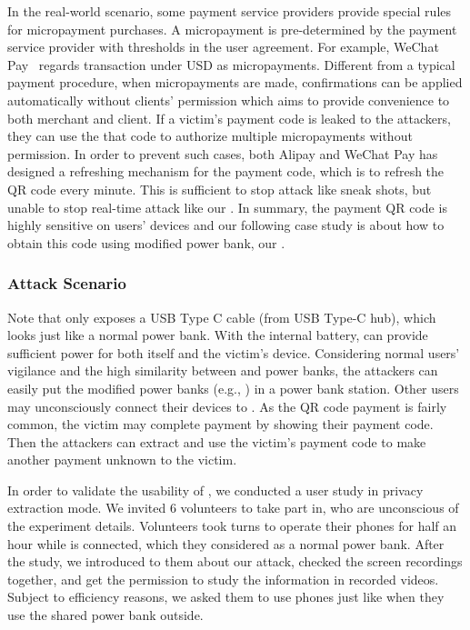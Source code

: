 In the real-world scenario, some payment service providers provide special rules for micropayment purchases.
A micropayment is pre-determined by the payment service provider with thresholds in the user agreement.
For example, WeChat Pay~\cite{Wechat-pay} regards transaction under USD  as micropayments.
Different from a typical payment procedure, when micropayments are made, confirmations can be applied automatically without clients' permission which aims to provide convenience to both merchant and client.
If a victim's payment code is leaked to the attackers, they can use the that code to authorize multiple micropayments without permission.
In order to prevent such cases, both Alipay and WeChat Pay has designed a refreshing mechanism for the payment code, which is to refresh the QR code every minute. This is sufficient to stop attack like sneak shots, but unable to stop real-time attack like our \tool.
In summary, the payment QR code is highly sensitive on users' devices and our following case study is about how to obtain this code using modified power bank, our \tool.

\subsubsection{Attack Scenario}

Note that \tool only exposes a USB Type C cable (from USB Type-C hub), which looks just like a normal power bank. With the internal battery, \tool can provide sufficient power for both itself and the victim's device.
Considering normal users' vigilance and the high similarity between \tool and power banks, the attackers can easily put the modified power banks (e.g., \tool) in a power bank station.
Other users may unconsciously connect their devices to \tool.
As the QR code payment is fairly common, the victim may complete payment by showing their payment code.
Then the attackers can extract and use the victim's payment code to make another payment unknown to the victim.

In order to validate the usability of \tool, we conducted a user study in privacy extraction mode.
We invited 6 volunteers to take part in, who are unconscious of the experiment details.
Volunteers took turns to operate their phones for half an hour while \tool is connected, which they considered as a normal power bank.
After the study, we introduced to them about our attack, checked the screen recordings together, and get the permission to study the information in recorded videos.
Subject to efficiency reasons, we asked them to use phones just like when they use the shared power bank outside.



